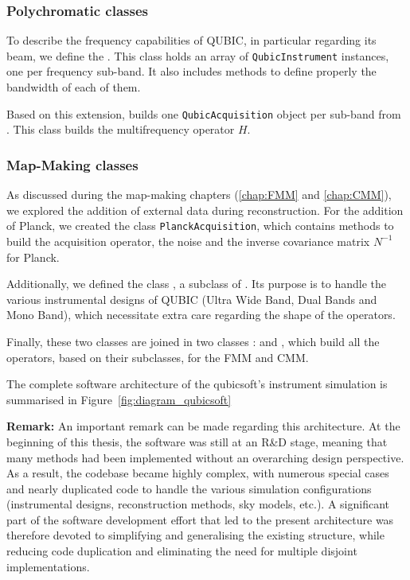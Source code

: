 \documentclass[../../thesis.tex]{subfiles}
\begin{document}
\subsubsection{Polychromatic classes}

To describe the frequency capabilities of QUBIC, in particular regarding its beam, we define the \texttt{}. This class holds an array of \texttt{QubicInstrument} instances, one per frequency sub-band. It also includes methods to define properly the bandwidth of each of them. 

Based on this extension, \texttt{} builds one \texttt{QubicAcquisition} object per sub-band from \texttt{}. This class builds the multifrequency operator $H$.

\subsubsection{Map-Making classes}

As discussed during the map-making chapters (\ref{chap:FMM} and \ref{chap:CMM}), we explored the addition of external data during reconstruction. For the addition of Planck, we created the class \texttt{PlanckAcquisition}, which contains methods to build the acquisition operator, the noise and the inverse covariance matrix $N^{-1}$ for Planck. 

Additionally, we defined the class \texttt{}, a subclass of \texttt{}. Its purpose is to handle the various instrumental designs of QUBIC (Ultra Wide Band, Dual Bands and Mono Band), which necessitate extra care regarding the shape of the operators.

Finally, these two classes are joined in two classes : \texttt{} and \texttt{}, which build all the operators, based on their subclasses, for the FMM and CMM.

The complete software architecture of the qubicsoft's instrument simulation is summarised in Figure~\ref{fig:diagram_qubicsoft}

\vspace{10pt}

\textbf{Remark:} An important remark can be made regarding this architecture. At the beginning of this thesis, the software was still at an R\&D stage, meaning that many methods had been implemented without an overarching design perspective. As a result, the codebase became highly complex, with numerous special cases and nearly duplicated code to handle the various simulation configurations (instrumental designs, reconstruction methods, sky models, etc.).
A significant part of the software development effort that led to the present architecture was therefore devoted to simplifying and generalising the existing structure, while reducing code duplication and eliminating the need for multiple disjoint implementations.
\end{document}
